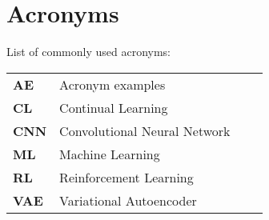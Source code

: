 
\chapter{Acronyms}
\label{chap:acronyms}

List of commonly used acronyms: \\

\begin{tabular}{llll}
	\textbf{AE}			&	Acronym examples \\
	\textbf{CL}			& 	Continual Learning \\
	\textbf{CNN}		& 	Convolutional Neural Network \\
	\textbf{ML}			& 	Machine Learning \\
	\textbf{RL}			& 	Reinforcement Learning \\
	\textbf{VAE}		&	Variational Autoencoder \\
	
\end{tabular}